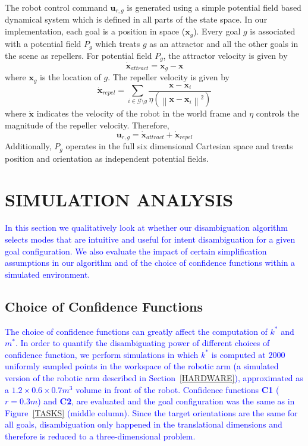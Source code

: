 \documentclass[conference]{IEEEtran}
\newcommand{\norm}[1]{\left\lVert#1\right\rVert}
\begin{document}
The robot control command $\boldsymbol{u}_{r,g}$ is generated using a simple potential field based dynamical system which is defined in all parts of the state space. In our implementation, each goal is a position in space ($\boldsymbol{x}_g$). Every goal $g$ is associated with a potential field $P_g$ which treats $g$ as an attractor and all the other goals in the scene as repellers. For potential field $P_g$, the attractor velocity is given by
\begin{equation*}
\dot{\boldsymbol{x}}_{attract} = \boldsymbol{x}_{g} - \boldsymbol{x}
\end{equation*}
where $\boldsymbol{x}_{g}$ is the location of $g$. The repeller velocity is given by
\begin{equation*}
\dot{\boldsymbol{x}}_{repel} = \sum_{i \in \mathcal{G} \setminus g} \frac{\boldsymbol{x} - \boldsymbol{x}_{i}}{\eta(\norm{\boldsymbol{x} - \boldsymbol{x}_{i}}^2)}
\end{equation*}
where $\dot{\boldsymbol{x}}$ indicates the velocity of the robot in the world frame and $\eta$ controls the magnitude of the repeller velocity. Therefore, 
\begin{equation*}
\boldsymbol{u}_{r,g} = \dot{\boldsymbol{x}}_{attract} + \dot{\boldsymbol{x}}_{repel} 
\end{equation*}
Additionally, $P_g$ operates in the full six dimensional Cartesian space and treats position and orientation as independent potential fields. 

\section{SIMULATION ANALYSIS} \label{SIMRESULTS}
\textcolor{blue}{In this section we qualitatively look at whether our disambiguation algorithm selects modes that are intuitive and useful for intent disambiguation for a given goal configuration. We also evaluate the impact of certain simplification assumptions in our algorithm and of the choice of confidence functions within a simulated environment.}

\subsection{Choice of Confidence Functions}
\textcolor{blue}{The choice of confidence functions can greatly affect the computation of $k^*$ and $m^*$. In order to quantify the disambiguating power of different choices of confidence function, we perform simulations in which $k^*$ is computed at $2000$ uniformly sampled points in the workspace of the robotic arm (a simulated version of the robotic arm described in Section~\ref{HARDWARE}), approximated as a $1.2\times0.6\times0.7 m^3$ volume in front of the robot. Confidence functions \textbf{C1} ($r=0.3m$) and \textbf{C2}, are evaluated and the goal configuration was the same as in Figure~\ref{TASKS} (middle column). Since the target orientations are the same for all goals, disambiguation only happened in the translational dimensions and therefore is reduced to a three-dimensional problem.}
\end{document}
